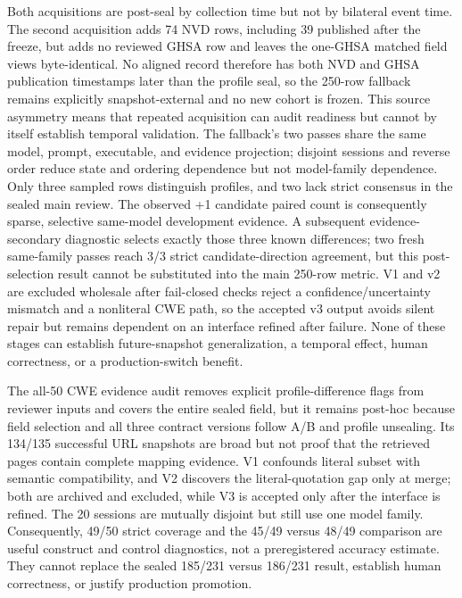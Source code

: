 Both acquisitions are post-seal by collection time but not by bilateral event time. The second acquisition adds 74 NVD rows, including 39 published after the freeze, but adds no reviewed GHSA row and leaves the one-GHSA matched field views byte-identical. No aligned record therefore has both NVD and GHSA publication timestamps later than the profile seal, so the 250-row fallback remains explicitly snapshot-external and no new cohort is frozen. This source asymmetry means that repeated acquisition can audit readiness but cannot by itself establish temporal validation. The fallback's two passes share the same model, prompt, executable, and evidence projection; disjoint sessions and reverse order reduce state and ordering dependence but not model-family dependence. Only three sampled rows distinguish profiles, and two lack strict consensus in the sealed main review. The observed +1 candidate paired count is consequently sparse, selective same-model development evidence. A subsequent evidence-secondary diagnostic selects exactly those three known differences; two fresh same-family passes reach 3/3 strict candidate-direction agreement, but this post-selection result cannot be substituted into the main 250-row metric. V1 and v2 are excluded wholesale after fail-closed checks reject a confidence/uncertainty mismatch and a nonliteral CWE path, so the accepted v3 output avoids silent repair but remains dependent on an interface refined after failure. None of these stages can establish future-snapshot generalization, a temporal effect, human correctness, or a production-switch benefit.

The all-50 CWE evidence audit removes explicit profile-difference flags from reviewer inputs and covers the entire sealed field, but it remains post-hoc because field selection and all three contract versions follow A/B and profile unsealing. Its 134/135 successful URL snapshots are broad but not proof that the retrieved pages contain complete mapping evidence. V1 confounds literal subset with semantic compatibility, and V2 discovers the literal-quotation gap only at merge; both are archived and excluded, while V3 is accepted only after the interface is refined. The 20 sessions are mutually disjoint but still use one model family. Consequently, 49/50 strict coverage and the 45/49 versus 48/49 comparison are useful construct and control diagnostics, not a preregistered accuracy estimate. They cannot replace the sealed 185/231 versus 186/231 result, establish human correctness, or justify production promotion.

